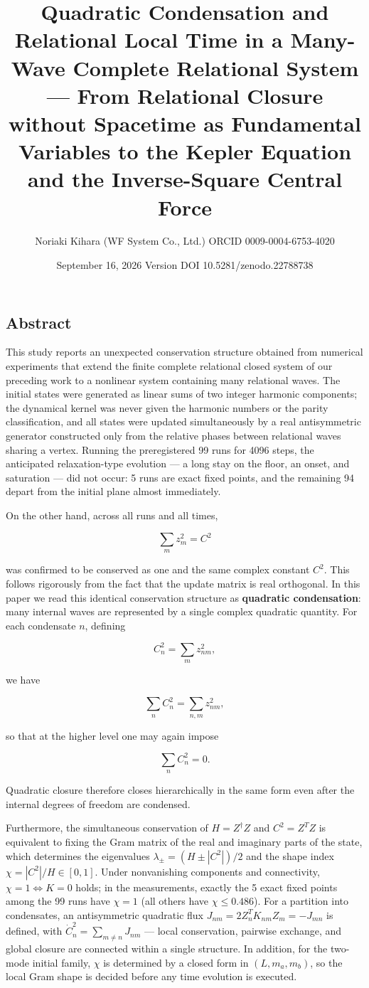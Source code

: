 \documentclass[
  a4paper,
]{article}
\title{Quadratic Condensation and Relational Local Time in a Many-Wave
Complete Relational System --- From Relational Closure without Spacetime
as Fundamental Variables to the Kepler Equation and the Inverse-Square
Central Force}
\author{Noriaki Kihara (WF System Co., Ltd.) ORCID 0009-0004-6753-4020}
\date{September 16, 2026 Version DOI 10.5281/zenodo.22788738}
\begin{document}
\maketitle

\subsection{Abstract}\label{abstract}

This study reports an unexpected conservation structure obtained from
numerical experiments that extend the finite complete relational closed
system of our preceding work to a nonlinear system containing many
relational waves. The initial states were generated as linear sums of
two integer harmonic components; the dynamical kernel was never given
the harmonic numbers or the parity classification, and all states were
updated simultaneously by a real antisymmetric generator constructed
only from the relative phases between relational waves sharing a vertex.
Running the preregistered 99 runs for 4096 steps, the anticipated
relaxation-type evolution --- a long stay on the floor, an onset, and
saturation --- did not occur: 5 runs are exact fixed points, and the
remaining 94 depart from the initial plane almost immediately.

On the other hand, across all runs and all times,

\[
\boxed{\sum_m z_m^2=C^2}
\]

was confirmed to be conserved as one and the same complex constant
\(C^2\). This follows rigorously from the fact that the update matrix is
real orthogonal. In this paper we read this identical conservation
structure as \textbf{quadratic condensation}: many internal waves are
represented by a single complex quadratic quantity. For each condensate
\(n\), defining

\[
C_n^2=\sum_m z_{nm}^2,
\]

we have

\[
\sum_n C_n^2=\sum_{n,m}z_{nm}^2,
\]

so that at the higher level one may again impose

\[
\boxed{\sum_n C_n^2=0}.
\]

Quadratic closure therefore closes hierarchically in the same form even
after the internal degrees of freedom are condensed.

Furthermore, the simultaneous conservation of \(H=Z^\dagger Z\) and
\(C^2=Z^TZ\) is equivalent to fixing the Gram matrix of the real and
imaginary parts of the state, which determines the eigenvalues
\(\lambda_\pm=(H\pm|C^2|)/2\) and the shape index
\(\chi=|C^2|/H\in[0,1]\). Under nonvanishing components and
connectivity, \(\chi=1\iff K=0\) holds; in the measurements, exactly the
5 exact fixed points among the 99 runs have \(\chi=1\) (all others have
\(\chi\le0.486\)). For a partition into condensates, an antisymmetric
quadratic flux \(J_{nm}=2Z_n^TK_{nm}Z_m=-J_{mn}\) is defined, with
\(\dot C_n^2=\sum_{m\ne n}J_{nm}\) --- local conservation, pairwise
exchange, and global closure are connected within a single structure. In
addition, for the two-mode initial family, \(\chi\) is determined by a
closed form in \((L,m_a,m_b)\), so the local Gram shape is decided
before any time evolution is executed.
\end{document}
